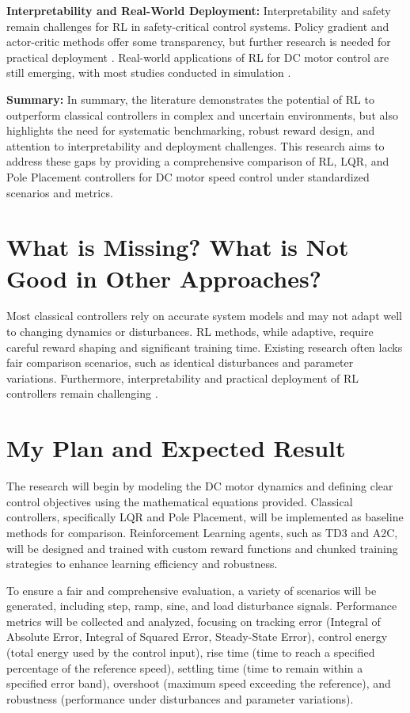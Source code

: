 \documentclass[conference]{IEEEtran}
\begin{document}
\textbf{Interpretability and Real-World Deployment:}
Interpretability and safety remain challenges for RL in safety-critical control systems. Policy gradient and actor-critic methods offer some transparency, but further research is needed for practical deployment \cite{Peters2010, Levine2016}. Real-world applications of RL for DC motor control are still emerging, with most studies conducted in simulation \cite{Zhang2021, Chen2022}.

\textbf{Summary:}
In summary, the literature demonstrates the potential of RL to outperform classical controllers in complex and uncertain environments, but also highlights the need for systematic benchmarking, robust reward design, and attention to interpretability and deployment challenges. This research aims to address these gaps by providing a comprehensive comparison of RL, LQR, and Pole Placement controllers for DC motor speed control under standardized scenarios and metrics.



\section{What is Missing? What is Not Good in Other Approaches?}
Most classical controllers rely on accurate system models and may not adapt well to changing dynamics or disturbances. RL methods, while adaptive, require careful reward shaping and significant training time. Existing research often lacks fair comparison scenarios, such as identical disturbances and parameter variations. Furthermore, interpretability and practical deployment of RL controllers remain challenging \cite{Peters2010}.

\section{My Plan and Expected Result}


The research will begin by modeling the DC motor dynamics and defining clear control objectives using the mathematical equations provided. Classical controllers, specifically LQR and Pole Placement, will be implemented as baseline methods for comparison. Reinforcement Learning agents, such as TD3 and A2C, will be designed and trained with custom reward functions and chunked training strategies to enhance learning efficiency and robustness.

To ensure a fair and comprehensive evaluation, a variety of scenarios will be generated, including step, ramp, sine, and load disturbance signals. Performance metrics will be collected and analyzed, focusing on tracking error (Integral of Absolute Error, Integral of Squared Error, Steady-State Error), control energy (total energy used by the control input), rise time (time to reach a specified percentage of the reference speed), settling time (time to remain within a specified error band), overshoot (maximum speed exceeding the reference), and robustness (performance under disturbances and parameter variations).
\end{document}
